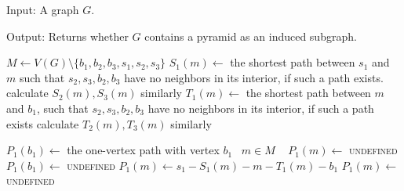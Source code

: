 \begin{alg}
	\label{alg:testPyramid}
	Input: A graph $G$.

	\noindent Output: Returns whether $G$ contains a pyramid as an induced subgraph.
\end{alg}
\begin{algorithmic}[1]
	 \label{line:pyramidTriangle}
		 \label{line:pyramidTriple}
			\label{line:a}
				\ls $M \gets V(G) \setminus \{b_1, b_2, b_3, s_1, s_2, s_3\}$
				 \label{line:pyramidSStart}
					\ls $S_1(m) \gets$ the shortest path between $s_1$ and $m$ such that
					\lsx $s_2, s_3, b_2, b_3$ have no neighbors in its interior, if such a 
					\lsx path exists.
					\ls calculate $S_2(m), S_3(m)$ similarly
					\ls $T_1(m) \gets$ the shortest path between $m$ and $b_1$, such that
					\lsx $s_2, s_3, b_2, b_3$ have no neighbors in its interior, if such a
					\lsx path exists
					\ls calculate $T_2(m), T_3(m)$ similarly
				\mEndFor \label{line:pyramidSEnd}
				 
					 
						\ls $P_1(b_1) \gets$ the one-vertex path with vertex $b_1$
						\ls \algorithmicforeach ~$m \in M$ \algorithmicdo~ $P_1(m) \gets$ \textsc{undefined}
					\mElse
						\ls $P_1(b_1) \gets $ \textsc{undefined}
								\ls $P_1(m) \gets s_1-S_1(m)-m-T_1(m)-b_1$
							\mElse
								\ls $P_1(m) \gets$ \textsc{undefined}
							\mEndIf
						\mEndFor
					\mEndIf 
				

\end{algorithmic}
